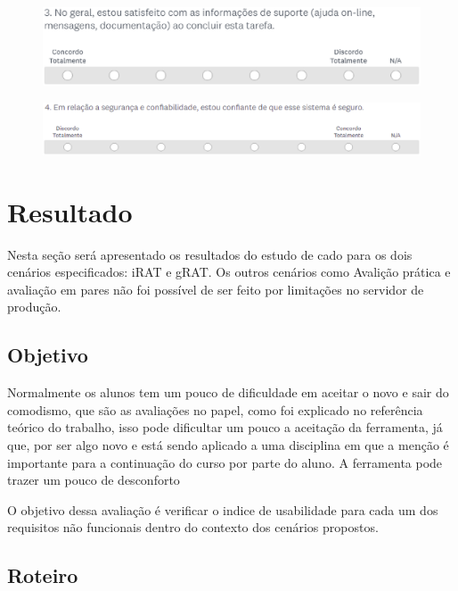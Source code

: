 \begin{figure}[h!]
  \centering
  \includegraphics[keepaspectratio=true,scale=0.5]{figuras/p3.eps}
\end{figure}

\begin{figure}[h!]
  \centering
  \includegraphics[keepaspectratio=true,scale=0.5]{figuras/p4.eps}
\end{figure}

\section{Resultado}

Nesta seção será apresentado os resultados do estudo de cado para os dois cenários especificados: iRAT e gRAT. Os outros
cenários como Avalição prática e avaliação em pares não foi possível de ser feito por limitações no servidor de
produção.

\subsection{Objetivo}

Normalmente os alunos tem um pouco de dificuldade em aceitar o novo e sair do comodismo, que são as avaliações no papel, como foi explicado no referência
teórico do trabalho, isso pode dificultar um pouco a aceitação da ferramenta, já que, por ser algo
novo e está sendo aplicado a uma disciplina em que a menção é importante para a continuação do curso por parte do aluno.
A ferramenta pode trazer um pouco de desconforto

O objetivo dessa avaliação é verificar o indice de usabilidade para cada um dos requisitos não funcionais dentro do
contexto dos cenários propostos.

\subsection{Roteiro}

